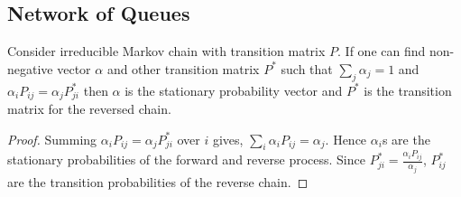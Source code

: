\documentclass[a4paper,10pt,english]{article}
\begin{document}
\subsection{Network of Queues}
\begin{thm}
Consider irreducible Markov chain with transition matrix $P$. If one can find non-negative vector $\alpha$ and other transition matrix $P^*$ such that $\sum_j \alpha_j =1$ and $\alpha_iP_{ij}=\alpha_jP^*_{ji}$ then $\alpha$ is the stationary probability vector and $P^*$ is the transition matrix for the reversed chain.
\end{thm}
\begin{proof}
Summing $\alpha_iP_{ij}=\alpha_jP_{ji}^*$ over $i$ gives, $\sum_{i}\alpha_iP_{ij}=\alpha_j$. Hence $\alpha_i$s are the stationary probabilities of the forward and reverse process. Since $P_{ji}^*=\frac{\alpha_iP_{ij}}{\alpha_j}$, $P_{ij}^*$ are the transition probabilities of the reverse chain.
\end{proof} 
\end{document}
